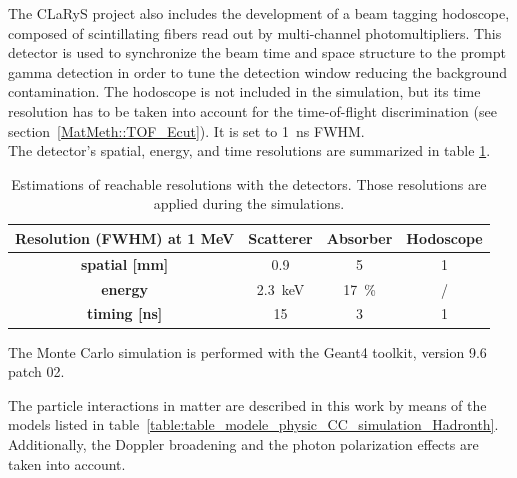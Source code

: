The CLaRyS project also includes the development of a beam tagging hodoscope, composed of scintillating fibers read out by multi-channel photomultipliers. This detector is used to synchronize the beam time and space structure to the prompt gamma detection in order to tune the detection window reducing the background contamination. The hodoscope is not included in the simulation, but its time resolution has to be taken into account for the time-of-flight discrimination (see section~\ref{MatMeth::TOF_Ecut}). It is set to 1~ns FWHM. \\
The detector's spatial, energy, and time resolutions are summarized in table \ref{table:table_resolution_detecteurs_CC_simulation_Hadronth}.

\begin{table}
\centering
\caption{Estimations of reachable resolutions with the detectors. Those resolutions are applied during the simulations.}
\begin{tabular}{cccc}
\hline
\textbf{Resolution (FWHM) at 1 MeV} & \textbf{Scatterer} & \textbf{Absorber} & \textbf{Hodoscope}\\
\hline 
\textbf{spatial [mm]	}			 &     0.9		 &  5 &	 1\\
\textbf{energy}				&	2.3~keV		&  17~\%	&	/\\
\textbf{timing [ns]}	        		&	15			&	3 	&  1\\
\hline
\end{tabular}
\label{table:table_resolution_detecteurs_CC_simulation_Hadronth}
\end{table}
    
The Monte Carlo simulation is performed with the Geant4 toolkit, version 9.6 patch 02. 

The particle interactions in matter are described in this work by means of the models listed in table~\ref{table:table_modele_physic_CC_simulation_Hadronth}. Additionally, the Doppler broadening and the photon polarization effects are taken into account.
 


